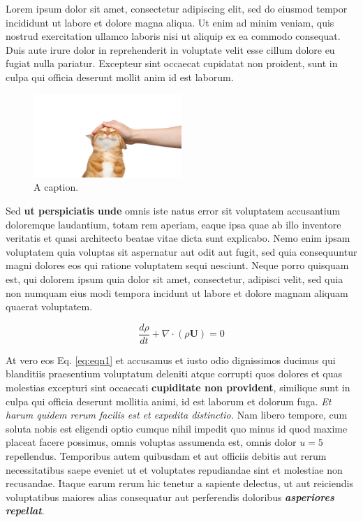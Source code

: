 Lorem ipsum dolor sit amet, consectetur adipiscing elit, sed do eiusmod tempor incididunt ut labore et dolore magna aliqua. Ut enim ad minim veniam, quis nostrud exercitation ullamco laboris nisi ut aliquip ex ea commodo consequat. Duis aute irure dolor in reprehenderit in voluptate velit esse cillum dolore eu fugiat nulla pariatur. Excepteur sint occaecat cupidatat non proident, sunt in culpa qui officia deserunt mollit anim id est laborum.

\begin{figure}
\centering
\includegraphics[width=0.5\textwidth]{cat.png}
\caption{A caption.}
\end{figure}

Sed \textbf{ut perspiciatis unde} omnis iste natus error sit voluptatem accusantium doloremque laudantium, totam rem aperiam, eaque ipsa quae ab illo inventore veritatis et quasi architecto beatae vitae dicta sunt explicabo. Nemo enim ipsam voluptatem quia voluptas sit aspernatur aut odit aut fugit, sed quia consequuntur magni dolores eos qui ratione voluptatem sequi nesciunt. Neque porro quisquam est, qui dolorem ipsum quia dolor sit amet, consectetur, adipisci velit, sed quia non numquam eius modi tempora incidunt ut labore et dolore magnam aliquam quaerat voluptatem. 

\begin{equation}
\frac{d\rho}{dt} 
+ \nabla \cdot \left( \rho \mathbf{U} \right) = 0 
\label{eq:eqn1}
\end{equation}

At vero eos Eq. \eqref{eq:eqn1} et accusamus et iusto odio dignissimos ducimus qui blanditiis praesentium voluptatum deleniti atque corrupti quos dolores et quas molestias excepturi sint occaecati \textbf{cupiditate non provident}, similique sunt in culpa qui officia deserunt mollitia animi, id est laborum et dolorum fuga. \textit{Et harum quidem rerum facilis est et expedita distinctio.} Nam libero tempore, cum soluta nobis est eligendi optio cumque nihil impedit quo minus id quod maxime placeat facere possimus, omnis voluptas assumenda est, omnis dolor $u = 5$ repellendus. Temporibus autem quibusdam et aut officiis debitis aut rerum necessitatibus saepe eveniet ut et voluptates repudiandae sint et molestiae non recusandae. Itaque earum rerum hic tenetur a sapiente delectus, ut aut reiciendis voluptatibus maiores alias consequatur aut perferendis doloribus \textit{\textbf{asperiores repellat}}.

